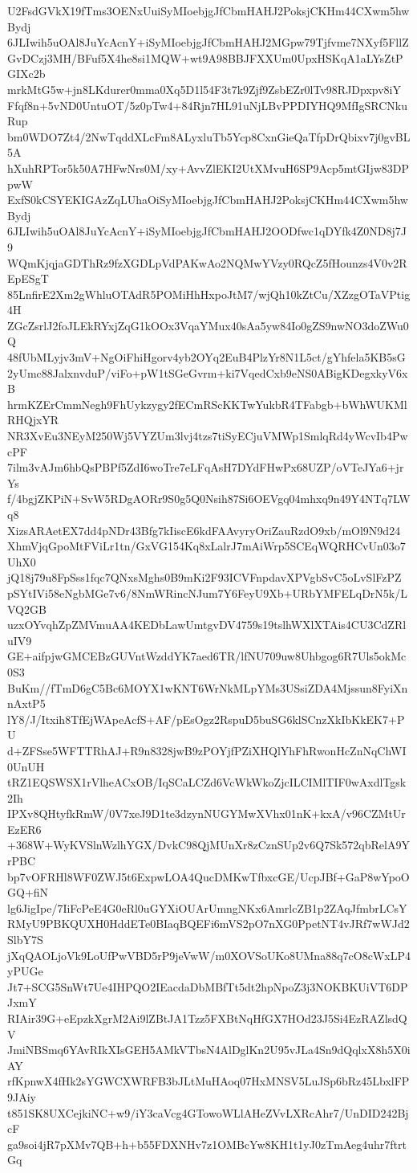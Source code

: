 U2FsdGVkX19fTms3OENxUuiSyMIoebjgJfCbmHAHJ2PoksjCKHm44CXwm5hwBydj
6JLIwih5uOAl8JuYcAcnY+iSyMIoebjgJfCbmHAHJ2MGpw79Tjfvme7NXyf5FllZ
GvDCzj3MH/BFuf5X4he8si1MQW+wt9A98BBJFXXUm0UpxHSKqA1aLYsZtPGIXc2b
mrkMtG5w+jn8LKdurer0mma0Xq5D1l54F3t7k9Zjf9ZsbEZr0lTv98RJDpxpv8iY
Ffqf8n+5vND0UntuOT/5z0pTw4+84Rjn7HL91uNjLBvPPDIYHQ9MfIgSRCNkuRup
bm0WDO7Zt4/2NwTqddXLcFm8ALyxluTb5Ycp8CxnGieQaTfpDrQbixv7j0gvBL5A
hXuhRPTor5k50A7HFwNrs0M/xy+AvvZlEKI2UtXMvuH6SP9Acp5mtGIjw83DPpwW
ExfS0kCSYEKIGAzZqLUhaOiSyMIoebjgJfCbmHAHJ2PoksjCKHm44CXwm5hwBydj
6JLIwih5uOAl8JuYcAcnY+iSyMIoebjgJfCbmHAHJ2OODfwc1qDYfk4Z0ND8j7J9
WQmKjqjaGDThRz9fzXGDLpVdPAKwAo2NQMwYVzy0RQcZ5fHounzs4V0v2REpESgT
85LnfirE2Xm2gWhluOTAdR5POMiHhHxpoJtM7/wjQh10kZtCu/XZzgOTaVPtig4H
ZGcZsrlJ2foJLEkRYxjZqG1kOOx3VqaYMux40sAa5yw84Io0gZS9nwNO3doZWu0Q
48fUbMLyjv3mV+NgOiFhiHgorv4yb2OYq2EuB4PlzYr8N1L5ct/gYhfela5KB5sG
2yUmc88JalxnvduP/viFo+pW1tSGeGvrm+ki7VqedCxb9eNS0ABigKDegxkyV6xB
hrmKZErCmmNegh9FhUykzygy2fECmRScKKTwYukbR4TFabgb+bWhWUKMlRHQjxYR
NR3XvEu3NEyM250Wj5VYZUm3lvj4tzs7tiSyECjuVMWp1SmlqRd4yWcvIb4PwcPF
7ilm3vAJm6hbQsPBPf5ZdI6woTre7eLFqAsH7DYdFHwPx68UZP/oVTeJYa6+jrYs
f/4bgjZKPiN+SvW5RDgAORr9S0g5Q0Nsih87Si6OEVgq04mhxq9n49Y4NTq7LWq8
XizsARAetEX7dd4pNDr43Bfg7kIiscE6kdFAAvyryOriZauRzdO9xb/mOl9N9d24
XhmVjqGpoMtFViLr1tn/GxVG154Kq8xLalrJ7mAiWrp5SCEqWQRHCvUn03o7UhX0
jQ18j79u8FpSss1fqc7QNxsMghs0B9mKi2F93ICVFnpdavXPVgbSvC5oLvSlFzPZ
pSYtIVi58eNgbMGe7v6/8NmWRincNJum7Y6FeyU9Xb+URbYMFELqDrN5k/LVQ2GB
uzxOYvqhZpZMVmuAA4KEDbLawUmtgvDV4759s19tslhWXlXTAis4CU3CdZRluIV9
GE+aifpjwGMCEBzGUVntWzddYK7aed6TR/lfNU709uw8Uhbgog6R7Uls5okMc0S3
BuKm//fTmD6gC5Bc6MOYX1wKNT6WrNkMLpYMs3USsiZDA4Mjssun8FyiXnnAxtP5
lY8/J/Itxih8TfEjWApeAcfS+AF/pEsOgz2RspuD5buSG6klSCnzXkIbKkEK7+PU
d+ZFSse5WFTTRhAJ+R9n8328jwB9zPOYjfPZiXHQlYhFhRwonHcZnNqChWI0UnUH
tRZ1EQSWSX1rVlheACxOB/IqSCaLCZd6VcWkWkoZjcILCIMlTIF0wAxdlTgsk2Ih
IPXv8QHtyfkRmW/0V7xeJ9D1te3dzynNUGYMwXVhx01nK+kxA/v96CZMtUrEzER6
+368W+WyKVSlnWzlhYGX/DvkC98QjMUnXr8zCznSUp2v6Q7Sk572qbRelA9YrPBC
bp7vOFRHl8WF0ZWJ5t6ExpwLOA4QucDMKwTfbxcGE/UcpJBf+GaP8wYpoOGQ+fiN
lg6JigIpe/7IiFcPeE4G0eRl0uGYXiOUArUmngNKx6AmrlcZB1p2ZAqJfmbrLCsY
RMyU9PBKQUXH0HddETe0BIaqBQEFi6mVS2pO7nXG0PpetNT4vJRf7wWJd2SlbY7S
jXqQAOLjoVk9LoUfPwVBD5rP9jeVwW/m0XOVSoUKo8UMna88q7cO8cWxLP4yPUGe
Jt7+SCG5SnWt7Ue4IHPQO2IEacdaDbMBfTt5dt2hpNpoZ3j3NOKBKUiVT6DPJxmY
RIAir39G+eEpzkXgrM2Ai9lZBtJA1Tzz5FXBtNqHfGX7HOd23J5Si4EzRAZlsdQV
JmiNBSmq6YAvRIkXIsGEH5AMkVTbsN4AlDglKn2U95vJLa4Sn9dQqlxX8h5X0iAY
rfKpnwX4fHk2sYGWCXWRFB3bJLtMuHAoq07HxMNSV5LuJSp6bRz45LbxlFP9JAiy
t851SK8UXCejkiNC+w9/iY3caVcg4GTowoWLlAHeZVvLXRcAhr7/UnDID242BjcF
ga9soi4jR7pXMv7QB+h+b55FDXNHv7z1OMBcYw8KH1t1yJ0zTmAeg4uhr7ftrtGq
